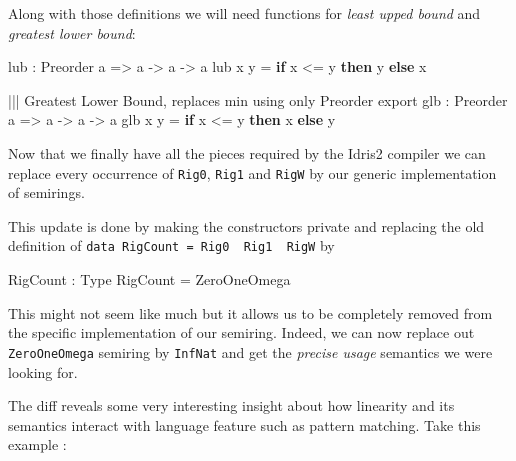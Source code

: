 \documentclass[
]{article}
\newenvironment{Shaded}{}{}
\newcommand{\DataTypeTok}[1]{\textcolor[rgb]{0.56,0.13,0.00}{#1}}
\newcommand{\FunctionTok}[1]{\textcolor[rgb]{0.02,0.16,0.49}{#1}}
\newcommand{\KeywordTok}[1]{\textcolor[rgb]{0.00,0.44,0.13}{\textbf{#1}}}
\newcommand{\NormalTok}[1]{#1}
\newcommand{\OperatorTok}[1]{\textcolor[rgb]{0.40,0.40,0.40}{#1}}
\newcommand{\OtherTok}[1]{\textcolor[rgb]{0.00,0.44,0.13}{#1}}
\begin{document}
Along with those definitions we will need functions for \emph{least
upped bound} and \emph{greatest lower bound}:

\begin{Shaded}
\begin{Highlighting}[]
\NormalTok{lub }\OperatorTok{:} \DataTypeTok{Preorder}\NormalTok{ a }\OtherTok{=\textgreater{}}\NormalTok{ a }\OtherTok{{-}\textgreater{}}\NormalTok{ a }\OtherTok{{-}\textgreater{}}\NormalTok{ a}
\NormalTok{ lub x y }\OtherTok{=} \KeywordTok{if}\NormalTok{ x }\OperatorTok{\textless{}=}\NormalTok{ y }\KeywordTok{then}\NormalTok{ y }\KeywordTok{else}\NormalTok{ x}

 \OperatorTok{|||} \DataTypeTok{Greatest} \DataTypeTok{Lower} \DataTypeTok{Bound}\NormalTok{, replaces }\FunctionTok{min}\NormalTok{ using only }\DataTypeTok{Preorder}
\NormalTok{ export}
\NormalTok{ glb }\OperatorTok{:} \DataTypeTok{Preorder}\NormalTok{ a }\OtherTok{=\textgreater{}}\NormalTok{ a }\OtherTok{{-}\textgreater{}}\NormalTok{ a }\OtherTok{{-}\textgreater{}}\NormalTok{ a}
\NormalTok{ glb x y }\OtherTok{=} \KeywordTok{if}\NormalTok{ x }\OperatorTok{\textless{}=}\NormalTok{ y }\KeywordTok{then}\NormalTok{ x }\KeywordTok{else}\NormalTok{ y}
\end{Highlighting}
\end{Shaded}

Now that we finally have all the pieces required by the Idris2 compiler
we can replace every occurrence of \texttt{Rig0}, \texttt{Rig1} and
\texttt{RigW} by our generic implementation of semirings.

This update is done by making the constructors private and replacing the
old definition of
\texttt{data\ RigCount\ =\ Rig0\ \textbar{}\ Rig1\ \textbar{}\ RigW} by

\begin{Shaded}
\begin{Highlighting}[]
\DataTypeTok{RigCount} \OperatorTok{:} \DataTypeTok{Type}
\DataTypeTok{RigCount} \OtherTok{=} \DataTypeTok{ZeroOneOmega}
\end{Highlighting}
\end{Shaded}

This might not seem like much but it allows us to be completely removed
from the specific implementation of our semiring. Indeed, we can now
replace out \texttt{ZeroOneOmega} semiring by \texttt{InfNat} and get
the \emph{precise usage} semantics we were looking for.

The diff reveals some very interesting insight about how linearity and
its semantics interact with language feature such as pattern matching.
Take this example :
\end{document}
